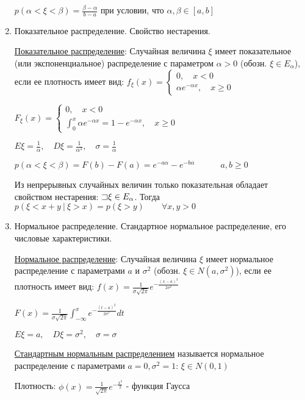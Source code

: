 \documentclass[12pt]{article}
\begin{document}
\begin{enumerate}
    $p(\alpha < \xi < \beta) = \frac{\beta - \alpha}{b - a}$ при условии, что $\alpha, \beta \in [a, b]$

    \item Показательное распределение. Свойство нестарения.

    \hyperlink{exponentialdistribution}{Показательное распределение}: Случайная величина $\xi$ имеет показательное (или экспоненциальное) распределение с параметром $\alpha > 0$ (обозн. $\xi \in E_\alpha$),
    если ее плотность имеет вид: $f_\xi(x) = \begin{cases}0, \quad x < 0 \\ \alpha e^{-\alpha x}, \quad x \geq 0\end{cases}$

    $F_\xi(x) = \begin{cases}0, \quad x < 0 \\ \int_0^x \alpha e^{-\alpha x} = 1 - e^{-\alpha x}, \quad x \geq 0\end{cases}$

    $E\xi = \frac{1}{\alpha}, \quad D\xi = \frac{1}{\alpha^2}, \quad \sigma = \frac{1}{\alpha}$

    $p(\alpha < \xi < \beta) = F(b) - F(a) = e^{-a\alpha} - e^{-b\alpha} \quad\quad\quad a, b \geq 0$

    Из непрерывных случайных величин только показательная обладает свойством нестарения:
    \Ths $\mathord{\sqsupset} \xi \in E_\alpha$. Тогда $p(\xi < x + y \ | \ \xi > x) = p(\xi > y) \quad\quad \forall x, y > 0$

    \item Нормальное распределение. Стандартное нормальное распределение, его числовые характеристики.

    \hyperlink{normaldistribution}{Нормальное распределение}: Случайная величина $\xi$ имеет нормальное распределение с параметрами $a$ и $\sigma^2$ (обозн. $\xi \in N(a, \sigma^2)$), если
    ее плотность имеет вид: $f(x) = \frac{1}{\sigma \sqrt{2\pi}} e^{-\frac{(x - a)^2}{2\sigma^2}}$

    $F(x) = \frac{1}{\sigma \sqrt{2\pi}} \int_{-\infty}^x e^{-\frac{(t - a)^2}{2\sigma^2}} dt$

    $E\xi = a, \quad D\xi = \sigma^2, \quad \sigma = \sigma$

    \hyperlink{standardnormaldistribution}{Стандартным нормальным распределением} называется нормальное распределение с параметрами $a = 0, \sigma^2 = 1$: $\xi \in N(0, 1)$

    Плотность: $\phi(x) = \frac{1}{\sqrt{2\pi}} e^{-\frac{x^2}{2}}$ - функция Гаусса


\end{enumerate}
\end{document}
